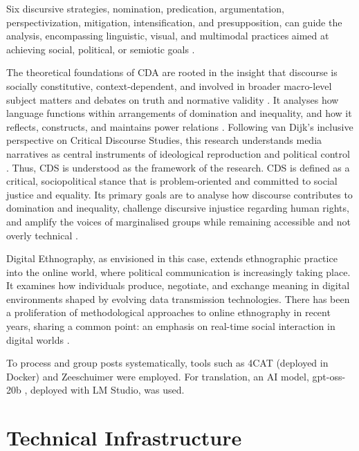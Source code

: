 Six discursive strategies,  nomination, predication, argumentation, perspectivization, mitigation, intensification, and presupposition,  can guide the analysis, encompassing linguistic, visual, and multimodal practices aimed at achieving social, political, or semiotic goals \citep{jackson_john_2019}.

The theoretical foundations of CDA are rooted in the insight that discourse is socially constitutive, context-dependent, and involved in broader macro-level subject matters and debates on truth and normative validity \citep{reisigl_discourse_2001}. It analyses how language functions within arrangements of domination and inequality, and how it reflects, constructs, and maintains power relations \citep{fairclough_discourse_1992}. Following van Dijk's inclusive perspective on Critical Discourse Studies, this research understands media narratives as central instruments of ideological reproduction and political control \citep{van_dijk_principles_1993}. Thus, CDS is understood as the framework of the research. CDS is defined as a critical, sociopolitical stance that is problem-oriented and committed to social justice and equality. Its primary goals are to analyse how discourse contributes to domination and inequality, challenge discursive injustice regarding human rights, and amplify the voices of marginalised groups while remaining accessible and not overly technical \citep{tannen_critical_2015}.

Digital Ethnography, as envisioned in this case, extends ethnographic practice into the online world, where political communication is increasingly taking place. It examines how individuals produce, negotiate, and exchange meaning in digital environments shaped by evolving data transmission technologies. There has been a proliferation of methodological approaches to online ethnography in recent years, sharing a common point: an emphasis on real-time social interaction in digital worlds \citep{delli_paoli_digital_2021}.

To process and group posts systematically, tools such as 4CAT \citep{peeters_4cat_2022} (deployed in Docker) and Zeeschuimer \citep{stijn_peeters_zeeschuimer_2025} were employed. For translation, an AI model, gpt-oss-20b \citep{openai_oai_gpt-oss_model_card_2025}, deployed with LM Studio, was used.

\pagebreak

\section{Technical Infrastructure}

